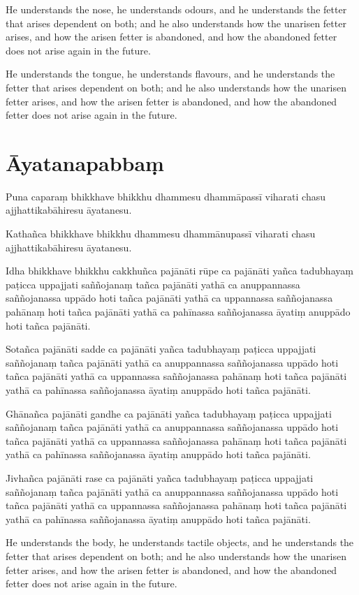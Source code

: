 He understands the nose, he understands odours, and he understands the fetter
that arises dependent on both; and he also understands how the unarisen fetter
arises, and how the arisen fetter is abandoned, and how the abandoned fetter
does not arise again in the future.

He understands the tongue, he understands flavours, and he understands the
fetter that arises dependent on both; and he also understands how the unarisen
fetter arises, and how the arisen fetter is abandoned, and how the abandoned
fetter does not arise again in the future.

\paliPage
\section*{Āyatanapabbaṃ}

Puna caparaṃ bhikkhave bhikkhu dhammesu dhammāpassī viharati chasu
ajjhattikabāhiresu āyatanesu.

Kathañca bhikkhave bhikkhu dhammesu dhammānupassī viharati chasu
ajjhattikabāhiresu āyatanesu.

Idha bhikkhave bhikkhu cakkhuñca pajānāti rūpe ca pajānāti yañca tadubhayaṃ
paṭicca uppajjati saññojanaṃ tañca pajānāti yathā ca anuppannassa saññojanassa
uppādo hoti tañca pajānāti yathā ca uppannassa saññojanassa pahānaṃ hoti tañca
pajānāti yathā ca pahīnassa saññojanassa āyatiṃ anuppādo hoti tañca pajānāti.

Sotañca pajānāti sadde ca pajānāti yañca tadubhayaṃ paṭicca uppajjati saññojanaṃ
tañca pajānāti yathā ca anuppannassa saññojanassa uppādo hoti tañca pajānāti
yathā ca uppannassa saññojanassa pahānaṃ hoti tañca pajānāti yathā ca pahīnassa
saññojanassa āyatiṃ anuppādo hoti tañca pajānāti.

Ghānañca pajānāti gandhe ca pajānāti yañca tadubhayaṃ paṭicca uppajjati
saññojanaṃ tañca pajānāti yathā ca anuppannassa saññojanassa uppādo hoti tañca
pajānāti yathā ca uppannassa saññojanassa pahānaṃ hoti tañca pajānāti yathā ca
pahīnassa saññojanassa āyatiṃ anuppādo hoti tañca pajānāti.

Jivhañca pajānāti rase ca pajānāti yañca tadubhayaṃ paṭicca uppajjati saññojanaṃ
tañca pajānāti yathā ca anuppannassa saññojanassa uppādo hoti tañca pajānāti
yathā ca uppannassa saññojanassa pahānaṃ hoti tañca pajānāti yathā ca pahīnassa
saññojanassa āyatiṃ anuppādo hoti tañca pajānāti.

\englishPage

He understands the body, he understands tactile objects, and he understands the
fetter that arises dependent on both; and he also understands how the unarisen
fetter arises, and how the arisen fetter is abandoned, and how the abandoned
fetter does not arise again in the future.

